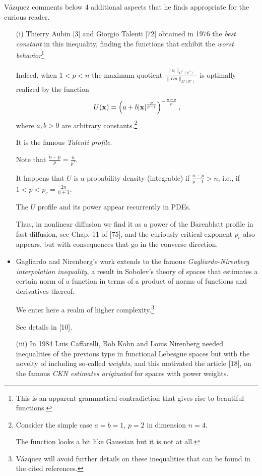 \documentclass{article}
\begin{document}
V\'azquez comments below 4 additional aspects that he finds appropriate for the curious reader.
\begin{itemize}
	\item[(i)] Thierry Aubin [3] and Giorgio Talenti [72] obtained in 1976 the \textit{best constant} in this inequality, finding the functions that exhibit the \textit{worst behavior}\footnote{This is an apparent grammatical contradiction that gives rise to beautiful functions.}
	
	Indeed, when $1 < p < n$ the maximum quotient $\frac{\|u\|_{L^{p^*}(\mathbb{R}^n)}}{\|Du\|_{L^p(\mathbb{R}^n)}}$ is optimally realized by the function
	\begin{align*}
		U({\bf x}) = \left(a + b|{\bf x}|^{\frac{p}{p - 1}}\right)^{-\frac{n - p}{p}},
	\end{align*}
	where $a,b > 0$ are arbitrary constants.\footnote{Consider the simple case $a = b = 1$, $p = 2$ in dimension $n = 4$.
		
		The function looks a bit like Gaussian but it is not at all.}
	
	It is the famous \textit{Talenti profile}.
	
	Note that $\frac{n - p}{p} = \frac{n}{p^*}$.
	
	It happens that $U$ is a probability density (integrable) if $\frac{n - p}{p - 1} > n$, i.e., if $1 < p < p_c = \frac{2n}{n + 1}$.
	
	The $U$ profile and its power appear recurrently in PDEs.
	
	Thus, in nonlinear diffusion we find it as a power of the Barenblatt profile in fast diffusion, see Chap. 11 of [75], and the curiously critical exponent $p_c$ also appears, but with consequences that go in the converse direction.
	\item Gagliardo and Nirenberg's work extends to the famous \textit{Gagliardo-Nirenberg interpolation inequality}, a result in Sobolev's theory of spaces that estimates a certain norm of a function in terms of a product of norms of functions and derivatives thereof.
	
	We enter here a realm of higher complexity.\footnote{V\'azquez will avoid further details on these inequalities that can be found in the cited references.}
	
	See details in [10].
	\item[(iii)] In 1984 Luis Caffarelli, Bob Kohn and Louis Nirenberg needed inequalities of the previous type in functional Lebesgue spaces but with the novelty of including so-called \textit{weights}, and this motivated the article [18], on the famous \textit{CKN estimates originated} for spaces with power weights.
	

\end{itemize}
\end{document}
